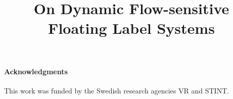 \documentclass[10pt, conference, compsocconf, letterpaper]{IEEEtran}
\newif\ifextended
\begin{document}
\title{On Dynamic Flow-sensitive Floating Label Systems}
\ifextended
\subtitle{Extended Version}

\fi

\author{
\and
{}
\and
{}
\and
{}
}


\maketitle












{\small
\paragraph{Acknowledgments}
This work was funded by the Swedish research agencies VR and STINT. 
}

{\frenchspacing


}
\end{document}
